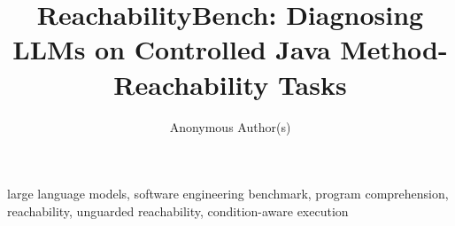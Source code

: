 \documentclass[10pt,conference]{IEEEtran}
\title{ReachabilityBench: Diagnosing LLMs on Controlled Java Method-Reachability Tasks}
\author{Anonymous Author(s)}
\begin{document}
\pagestyle{plain}
\linenumbers
\maketitle

\begin{abstract}

\end{abstract}

\begin{IEEEkeywords}
large language models, software engineering benchmark, program comprehension, reachability, unguarded reachability, condition-aware execution
\end{IEEEkeywords}











% 

% 



\end{document}
